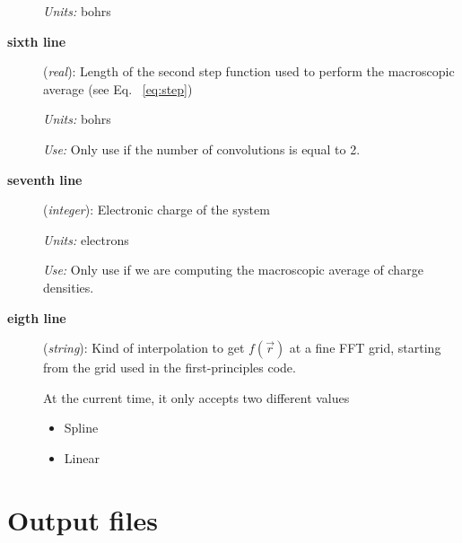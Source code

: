 \begin{description}
      {\it Units:} bohrs

 \item[{\bf sixth line}] ({\it real}):
      Length of the second step function used to perform
      the macroscopic average (see Eq. ~\ref{eq:step})

      {\it Units:} bohrs

      {\it Use:} Only use if the number of convolutions is equal to 2.

 \item[{\bf seventh line}] ({\it integer}):
      Electronic charge of the system

      {\it Units:} electrons

      {\it Use:} Only use if we are computing the macroscopic average of
                 charge densities.

 \item[{\bf eigth line}] ({\it string}):
      Kind of interpolation to get $f \left( \vec{r} \right)$
      at a fine FFT grid, starting from the grid used
      in the first-principles code.

      At the current time, it only accepts two different values

      \begin{itemize}
         \item Spline
         \item Linear
      \end{itemize}

 \end{description}


%
%

\section{Output files}
\label{section:output}


